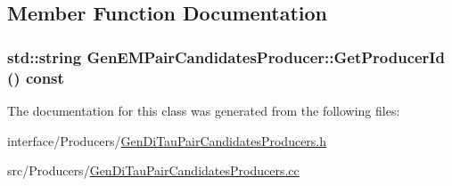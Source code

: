 \subsection{Member Function Documentation}
\hypertarget{classGenEMPairCandidatesProducer_af1cae3d7fa5c04cd3e58a28f309a4bf1}{
\subsubsection[{GetProducerId}]{\setlength{\rightskip}{0pt plus 5cm}std::string GenEMPairCandidatesProducer::GetProducerId () const}}
\label{classGenEMPairCandidatesProducer_af1cae3d7fa5c04cd3e58a28f309a4bf1}


The documentation for this class was generated from the following files:\begin{DoxyCompactItemize}
\item 
interface/Producers/\hyperlink{GenDiTauPairCandidatesProducers_8h}{GenDiTauPairCandidatesProducers.h}\item 
src/Producers/\hyperlink{GenDiTauPairCandidatesProducers_8cc}{GenDiTauPairCandidatesProducers.cc}\end{DoxyCompactItemize}
